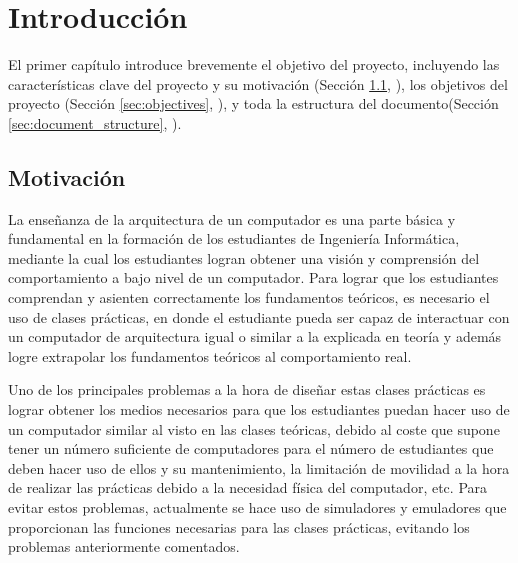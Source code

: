 \chead[]{}
\renewcommand{\headrulewidth}{0.5pt}

\lfoot[]{}
\cfoot[]{}
\rfoot[]{}
\renewcommand{\footrulewidth}{0pt}

\chapter{Introducción}
\label{ch:introduction}

El primer capítulo introduce brevemente el objetivo del proyecto, incluyendo las características clave del proyecto y su motivación (Sección \ref{sec:background_and_motivation}, \textit{}), los objetivos del proyecto (Sección \ref{sec:objectives}, \textit{}), y toda la estructura del documento(Sección \ref{sec:document_structure}, \textit{}).

\section{Motivación}
\label{sec:background_and_motivation}

La enseñanza de la arquitectura de un computador es una parte básica y fundamental en la formación de los estudiantes de Ingeniería Informática, mediante la cual los estudiantes logran obtener una visión y comprensión del comportamiento a bajo nivel de un computador. Para lograr que los estudiantes comprendan y asienten correctamente los fundamentos teóricos, es necesario el uso de clases prácticas, en donde el estudiante pueda ser capaz de interactuar con un computador de arquitectura igual o similar a la explicada en teoría y además logre extrapolar los fundamentos teóricos al comportamiento real.

Uno de los principales problemas a la hora de diseñar estas clases prácticas es lograr obtener los medios necesarios para que los estudiantes puedan hacer uso de un computador similar al visto en las clases teóricas, debido al coste que supone tener un número suficiente de computadores para el número de estudiantes que deben hacer uso de ellos y su mantenimiento, la limitación de movilidad a la hora de realizar las prácticas debido a la necesidad física del computador, etc. Para evitar estos problemas, actualmente se hace uso de simuladores y emuladores que proporcionan las funciones necesarias para las clases prácticas, evitando los problemas anteriormente comentados.

